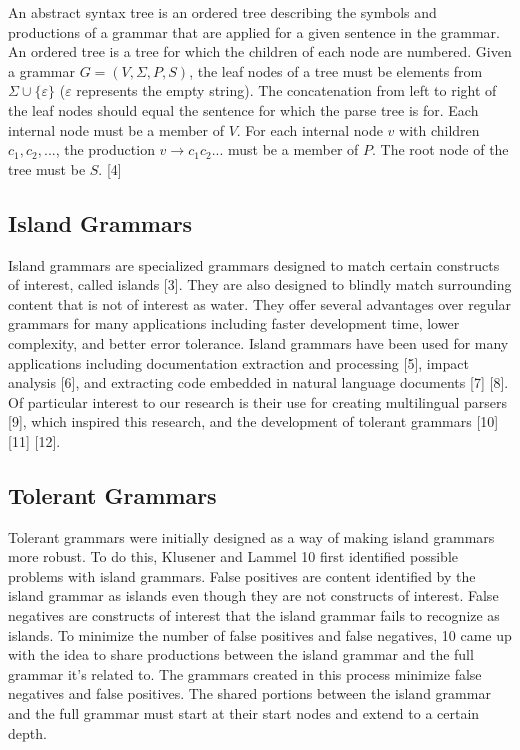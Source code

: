 \documentclass[conference,compsoc]{IEEEtran}
\begin{document}
An abstract syntax tree is an ordered tree describing the symbols and
productions of a grammar that are applied for a given sentence in the
grammar. An ordered tree is a tree for which the children of each node
are numbered. Given a grammar \(G = (V,\Sigma,P,S)\), the leaf nodes of
a tree must be elements from \(\Sigma\cup\{\varepsilon\}\)
(\(\varepsilon\) represents the empty string). The concatenation from
left to right of the leaf nodes should equal the sentence for which the
parse tree is for. Each internal node must be a member of \(V\). For
each internal node \(v\) with children \(c_1, c_2,...\), the production
\(v \rightarrow c_1c_2...\) must be a member of \(P\). The root node of
the tree must be \(S\). {[}4{]}

\hypertarget{island-grammars}{%
\subsection{Island Grammars}\label{island-grammars}}

Island grammars are specialized grammars designed to match certain
constructs of interest, called islands {[}3{]}. They are also designed
to blindly match surrounding content that is not of interest as water.
They offer several advantages over regular grammars for many
applications including faster development time, lower complexity, and
better error tolerance. Island grammars have been used for many
applications including documentation extraction and processing {[}5{]},
impact analysis {[}6{]}, and extracting code embedded in natural
language documents {[}7{]} {[}8{]}. Of particular interest to our
research is their use for creating multilingual parsers {[}9{]}, which
inspired this research, and the development of tolerant grammars
{[}10{]} {[}11{]} {[}12{]}.

\hypertarget{tolerant-grammars}{%
\subsection{Tolerant Grammars}\label{tolerant-grammars}}

Tolerant grammars were initially designed as a way of making island
grammars more robust. To do this, Klusener and Lammel 10 first
identified possible problems with island grammars. False positives are
content identified by the island grammar as islands even though they are
not constructs of interest. False negatives are constructs of interest
that the island grammar fails to recognize as islands. To minimize the
number of false positives and false negatives, 10 came up with the idea
to share productions between the island grammar and the full grammar
it's related to. The grammars created in this process minimize false
negatives and false positives. The shared portions between the island
grammar and the full grammar must start at their start nodes and extend
to a certain depth.
\end{document}
